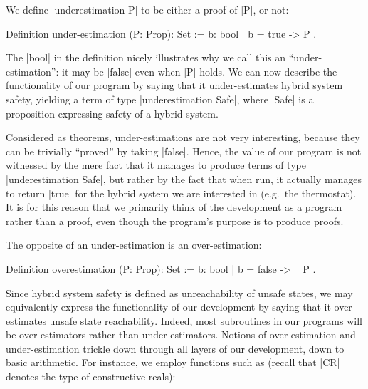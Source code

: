 \documentclass[runningheads]{llncs}
\begin{document}
We define |underestimation P| to be either a proof of |P|, or not:
\begin{code}
Definition under-estimation (P: Prop): Set := { b: bool | b = true -> P }.
\end{code}
The |bool| in the definition nicely illustrates why we call this an
``under-estimation'': it may be |false| even when |P| holds. We can now
describe the functionality of our program by saying that it
under-estimates hybrid system safety, yielding a term of type
|underestimation Safe|, where |Safe| is a proposition expressing
safety of a hybrid system.

Considered as theorems, under-estimations are not very interesting,
because they can be trivially ``proved'' by taking
|false|. Hence, the value of our program is not witnessed by
the mere fact that it manages to produce terms of type
|underestimation Safe|, but rather by the fact that when run, it
actually manages to return |true| for the hybrid system we
are interested in (e.g.\ the thermostat). It is for this reason that
we primarily think of the development as a program rather than a
proof, even though the program's purpose is to produce proofs.

The opposite of an under-estimation is an over-estimation:
\begin{code}
Definition overestimation (P: Prop): Set := { b: bool | b = false -> ~ P }.
\end{code}

Since hybrid system safety is defined as unreachability of unsafe
states, we may equivalently express the functionality of our
development by saying that it over-estimates unsafe state
reachability. Indeed, most subroutines in our programs will be
over-estimators rather than under-estimators. Notions of over-estimation
and under-estimation trickle down through all layers of our
development, down to basic arithmetic. For instance, we employ
functions such as (recall that |CR| denotes the type of constructive
reals):


\end{document}
